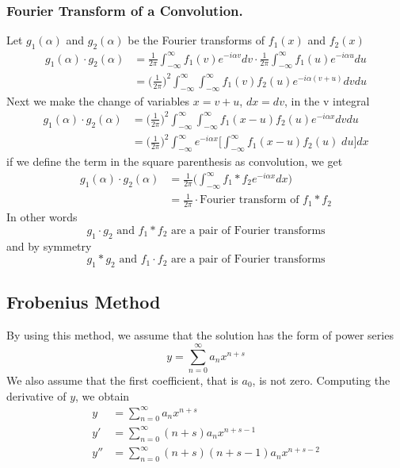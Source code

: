\documentclass[../main.tex]{subfiles}
\begin{document}
\subsubsection*{Fourier Transform of a Convolution.} Let $g_1(\alpha)$ and $g_2(\alpha)$ be the Fourier transforms of $f_1(x)$ and $f_2(x)$
\begin{align*}
    g_1(\alpha)\cdot g_2(\alpha)&=\frac{1}{2\pi}\int_{-\infty}^{\infty}f_1(v)e^{-i\alpha v}dv\cdot \frac{1}{2\pi}\int_{-\infty}^{\infty}f_1(u)e^{-i\alpha u}du\\
    &=\biggl(\frac{1}{2\pi}\biggr)^2\int_{-\infty}^{\infty}\int_{-\infty}^{\infty} f_1(v)f_2(u)e^{-i\alpha (v+u)}dvdu
\end{align*}
Next we make the change of variables $x = v + u$, $dx = dv$, in the v integral
\begin{align*}
    g_1(\alpha)\cdot g_2(\alpha)&= \biggl(\frac{1}{2\pi}\biggr)^2\int_{-\infty}^{\infty}\int_{-\infty}^{\infty} f_1(x-u)f_2(u)e^{-i\alpha x}dvdu\\
    &= \biggl(\frac{1}{2\pi}\biggr)^2\int_{-\infty}^{\infty}e^{-i\alpha x}\biggl[\int_{-\infty}^{\infty}f_1(x-u)f_2(u)\;du\biggr]dx
\end{align*}
if we define the term in the square parenthesis as convolution, we get 
\begin{align*}
    g_1(\alpha)\cdot g_2(\alpha)&=\frac{1}{2\pi}\biggl(\int_{-\infty}^{\infty}f_1*f_2e^{-i\alpha x}dx\biggr)\\
    &=\frac{1}{2\pi}\cdot\text{Fourier transform of }f_1*f_2
\end{align*}
In other words
\begin{equation*}
    g_1\cdot g_2\text{ and }f_1*f_2\text{ are a pair of Fourier transforms}
\end{equation*}
and by symmetry 
\begin{equation*}
    g_1* g_2\text{ and }f_1\cdot f_2\text{ are a pair of Fourier transforms}
\end{equation*}

\subsection*{Frobenius Method}
By using this method, we assume that the solution has the form of power series
\begin{equation*}
    y=\sum_{n=0}^{\infty} a_nx^{n+s}
\end{equation*}
We also assume that the first coefficient, that is $a_0$, is not zero. Computing the derivative of $y$, we obtain
\begin{align*}
    y&=\sum_{n=0}^{\infty} a_nx^{n+s} \\
    y'&=\sum_{n=0}^{\infty} (n+s) a_nx^{n+s-1}\\
    y''&=\sum_{n=0}^{\infty} (n+s) (n+s-1)a_nx^{n+s-2} 
\end{align*}
\end{document}
